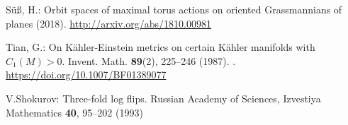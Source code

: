 \documentclass{amsart}
\theoremstyle{definition}
\begin{document}
\begin{thebibliography}{10}
S{\"u}{\ss}, H.: {Orbit spaces of maximal torus actions on oriented
  {G}rassmannians of planes} (2018).
\newblock \urlprefix\url{http://arxiv.org/abs/1810.00981}

Tian, G.: On {K}\"{a}hler-{E}instein metrics on certain {K}\"{a}hler manifolds
  with {$C_1(M)>0$}.
\newblock Invent. Math. \textbf{89}(2), 225--246 (1987).
\newblock {}.
\newblock \urlprefix\url{https://doi.org/10.1007/BF01389077}

V.Shokurov: Three-fold log flips.
\newblock Russian Academy of Sciences, Izvestiya Mathematics \textbf{40},
  95--202 (1993)

\end{thebibliography}
\end{document}
